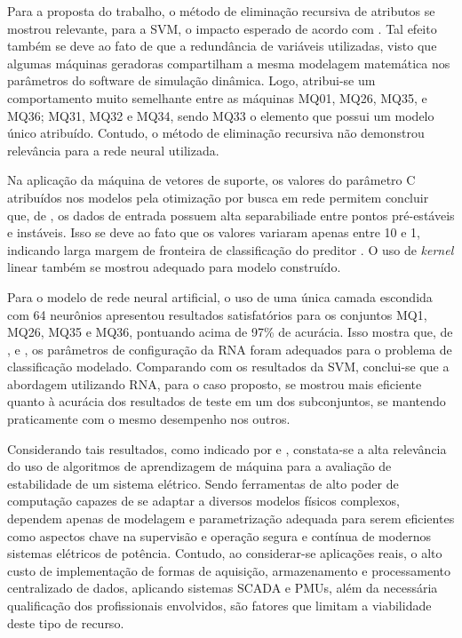 \documentclass[12pt,oneside,a4paper,chapter=TITLE,section=TITLE,sumario=tradicional,english,brazil]{abntex2}
\begin{document}
Para a proposta do trabalho, o método  de eliminação recursiva de atributos se mostrou relevante, para a SVM, o impacto esperado de acordo com \textcite{Xu2016}. Tal efeito também se deve ao fato de que a redundância de variáveis utilizadas, visto que algumas máquinas geradoras compartilham a mesma modelagem matemática nos parâmetros do software de simulação dinâmica. Logo, atribui-se um comportamento muito semelhante entre as máquinas MQ01, MQ26, MQ35, e MQ36; MQ31, MQ32 e MQ34, sendo MQ33 o elemento que possui um modelo único atribuído. Contudo, o método de eliminação recursiva não demonstrou relevância para a rede neural utilizada.\par 
Na aplicação da máquina de vetores de suporte, os valores do parâmetro C atribuídos nos modelos pela otimização por busca em rede permitem concluir que, de \textcite{haykin2009}, os dados de entrada possuem alta separabiliade entre pontos pré-estáveis e instáveis. Isso se deve ao fato que os valores variaram apenas entre 10 e 1, indicando larga margem de fronteira de classificação do preditor \cite{haykin2009}. O uso de \textit{kernel} linear também se mostrou adequado para modelo construído.\par 
Para o modelo de rede neural artificial, o uso de uma única camada escondida com 64 neurônios apresentou resultados satisfatórios para os conjuntos MQ1, MQ26, MQ35 e MQ36, pontuando acima de 97\% de acurácia. Isso mostra que, de \cite{arteaga2019}, \textcite{bottou2005} e \textcite{bishop2006}, os parâmetros de configuração da RNA foram adequados para o problema de classificação modelado. Comparando com os resultados da SVM, conclui-se que a abordagem utilizando RNA, para o caso proposto, se mostrou mais eficiente quanto à acurácia dos resultados de teste em um dos subconjuntos, se mantendo praticamente com o mesmo desempenho nos outros.\par
Considerando tais resultados, como indicado por \cite{gharehpetian2008} e \cite{Xu2016}, constata-se a alta relevância do uso de algoritmos de aprendizagem de máquina para a avaliação de estabilidade de um sistema elétrico. Sendo ferramentas de alto poder de computação capazes de se adaptar a diversos modelos físicos complexos, dependem apenas de modelagem e parametrização adequada para serem eficientes  \cite{bishop2006} como aspectos chave na supervisão e operação segura e contínua de modernos sistemas elétricos de potência. Contudo, ao considerar-se aplicações reais, o alto custo de implementação de formas de aquisição, armazenamento e processamento centralizado de dados, aplicando sistemas SCADA e PMUs, além da necessária qualificação dos profissionais envolvidos, são fatores que limitam a viabilidade deste tipo de recurso.\par 
\end{document}
